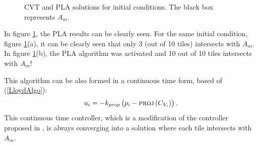 \documentclass{iacas}
\begin{document}
\begin{figure}
	\captionsetup[subfigure]{position=b}
	\centering
	\caption{CVT and PLA solutions for initial conditions. The black box represents $A_m$.}
\label{fig:projected lloyds algorithm}
\end{figure}

In figure \ref{fig:projected lloyds algorithm}, the PLA results can be clearly seen. For the same initial condition, figure \ref{fig:projected lloyds algorithm}(a), it can be clearly seen that only 3 (out of 10 tiles) intersects with $A_m$. In figure \ref{fig:projected lloyds algorithm}(b), the PLA algorithm was activated and 10 out of 10 tiles intersects with $A_m$!

This algorithm can be also formed in a continuous time form, based of (\ref{LloydAlgo}): %
\begin{equation} \label{ProjectedLloydsContol}
u_{i} = -k_{prop}\left( p_i - \textsc{proj}\left( C_{V_{i}} \right) \right).
\end{equation}
This continuous time controller, which is a modification of the controller proposed in \cite{Cortes2004}, is always converging into a solution where each tile intersects with $A_m$.
\end{document}
